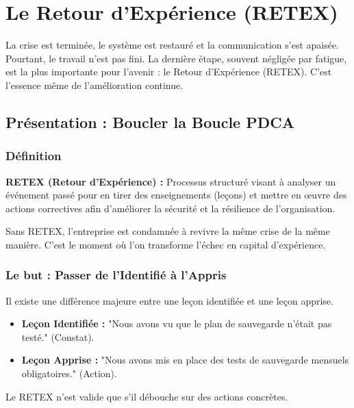 \chapter{Le Retour d'Expérience (RETEX)}
\label{chap:retex}

La crise est terminée, le système est restauré et la communication s'est apaisée. Pourtant, le travail n'est pas fini. La dernière étape, souvent négligée par fatigue, est la plus importante pour l'avenir : le Retour d'Expérience (RETEX). C'est l'essence même de l'amélioration continue.

\section{Présentation : Boucler la Boucle PDCA}

\subsection{Définition}

\begin{boxdef}
\textbf{RETEX (Retour d'Expérience) :} Processus structuré visant à analyser un événement passé pour en tirer des enseignements (leçons) et mettre en œuvre des actions correctives afin d'améliorer la sécurité et la résilience de l'organisation.
\end{boxdef}

Sans RETEX, l'entreprise est condamnée à revivre la même crise de la même manière. C'est le moment où l'on transforme l'échec en capital d'expérience.

\subsection{Le but : Passer de l'Identifié à l'Appris}

Il existe une différence majeure entre une leçon identifiée et une leçon apprise.
\begin{itemize}
    \item \textbf{Leçon Identifiée :} "Nous avons vu que le plan de sauvegarde n'était pas testé." (Constat).
    \item \textbf{Leçon Apprise :} "Nous avons mis en place des tests de sauvegarde mensuels obligatoires." (Action).
\end{itemize}

Le RETEX n'est valide que s'il débouche sur des actions concrètes.

